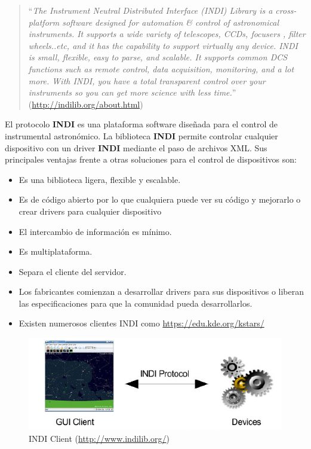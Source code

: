 \begin{quote}``\textit{The Instrument Neutral Distributed Interface (INDI) Library is a cross-platform software designed for automation & control of astronomical instruments. It supports a wide variety of telescopes, CCDs, focusers , filter wheels..etc, and it has the capability to support virtually any device. INDI is small, flexible, easy to parse, and scalable. It supports common DCS functions such as remote control, data acquisition, monitoring, and a lot more. With INDI, you have a total transparent control over your instruments so you can get more science with less time.}''
\newline(\url{http://indilib.org/about.html})
\end{quote}

\bigskip

El protocolo \textbf{INDI} es una plataforma software diseñada para el control de instrumental astronómico. La biblioteca \textbf{INDI} permite controlar cualquier dispositivo con un driver \textbf{INDI} mediante el paso de archivos XML. Sus principales ventajas frente a otras soluciones para el control de dispositivos son:


\begin{itemize}
  \item Es una biblioteca ligera, flexible y escalable.
  \item Es de código abierto por lo que cualquiera puede ver su código y mejorarlo o crear drivers para cualquier dispositivo
  \item El intercambio de información es mínimo.
  \item Es multiplataforma.
  \item Separa el cliente del servidor.
  \item Los fabricantes comienzan a desarrollar drivers para sus dispositivos o liberan las especificaciones para que la comunidad pueda desarrollarlos.
  \item Existen numerosos clientes INDI como \url{https://edu.kde.org/kstars/}

\end{itemize}

\bigskip
\begin{figure}[!ht]
  \begin{center}
    \includegraphics[width=1\textwidth]{../images/Indi_client.png}
    \caption{INDI Client (\url{http://www.indilib.org/})}
    \label{fig:indi_client}
  \end{center}
\end{figure}

